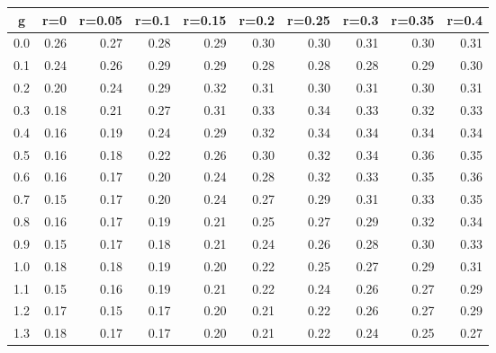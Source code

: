 %
\begin{table}[!tbp]
 \begin{center}
 \begin{tabular}{rrrrrrrrrr}\hline\hline
\multicolumn{1}{c}{g}&\multicolumn{1}{c}{r=0}&\multicolumn{1}{c}{r=0.05}&\multicolumn{1}{c}{r=0.1}&\multicolumn{1}{c}{r=0.15}&\multicolumn{1}{c}{r=0.2}&\multicolumn{1}{c}{r=0.25}&\multicolumn{1}{c}{r=0.3}&\multicolumn{1}{c}{r=0.35}&\multicolumn{1}{c}{r=0.4}\tabularnewline
\hline
0.0&0.26&0.27&0.28&0.29&0.30&0.30&0.31&0.30&0.31\tabularnewline
0.1&0.24&0.26&0.29&0.29&0.28&0.28&0.28&0.29&0.30\tabularnewline
0.2&0.20&0.24&0.29&0.32&0.31&0.30&0.31&0.30&0.31\tabularnewline
0.3&0.18&0.21&0.27&0.31&0.33&0.34&0.33&0.32&0.33\tabularnewline
0.4&0.16&0.19&0.24&0.29&0.32&0.34&0.34&0.34&0.34\tabularnewline
0.5&0.16&0.18&0.22&0.26&0.30&0.32&0.34&0.36&0.35\tabularnewline
0.6&0.16&0.17&0.20&0.24&0.28&0.32&0.33&0.35&0.36\tabularnewline
0.7&0.15&0.17&0.20&0.24&0.27&0.29&0.31&0.33&0.35\tabularnewline
0.8&0.16&0.17&0.19&0.21&0.25&0.27&0.29&0.32&0.34\tabularnewline
0.9&0.15&0.17&0.18&0.21&0.24&0.26&0.28&0.30&0.33\tabularnewline
1.0&0.18&0.18&0.19&0.20&0.22&0.25&0.27&0.29&0.31\tabularnewline
1.1&0.15&0.16&0.19&0.21&0.22&0.24&0.26&0.27&0.29\tabularnewline
1.2&0.17&0.15&0.17&0.20&0.21&0.22&0.26&0.27&0.29\tabularnewline
1.3&0.18&0.17&0.17&0.20&0.21&0.22&0.24&0.25&0.27\tabularnewline
\hline
\end{tabular}

\end{center}

\end{table}

